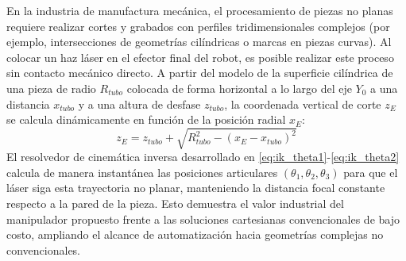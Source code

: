 \documentclass[conference,a4paper]{IEEEtran}
\begin{document}
En la industria de manufactura mecánica, el procesamiento de piezas no planas requiere realizar cortes y grabados con perfiles tridimensionales complejos (por ejemplo, intersecciones de geometrías cilíndricas o marcas en piezas curvas). Al colocar un haz láser en el efector final del robot, es posible realizar este proceso sin contacto mecánico directo. A partir del modelo de la superficie cilíndrica de una pieza de radio $R_{tubo}$ colocada de forma horizontal a lo largo del eje $Y_0$ a una distancia $x_{tubo}$ y a una altura de desfase $z_{tubo}$, la coordenada vertical de corte $z_E$ se calcula dinámicamente en función de la posición radial $x_E$:
\begin{equation}
z_E = z_{tubo} + \sqrt{R_{tubo}^2 - (x_E - x_{tubo})^2}
\label{eq:tubo}
\end{equation}
El resolvedor de cinemática inversa desarrollado en \eqref{eq:ik_theta1}-\eqref{eq:ik_theta2} calcula de manera instantánea las posiciones articulares $(\theta_1, \theta_2, \theta_3)$ para que el láser siga esta trayectoria no planar, manteniendo la distancia focal constante respecto a la pared de la pieza. Esto demuestra el valor industrial del manipulador propuesto frente a las soluciones cartesianas convencionales de bajo costo, ampliando el alcance de automatización hacia geometrías complejas no convencionales.

\appendices
\end{document}
